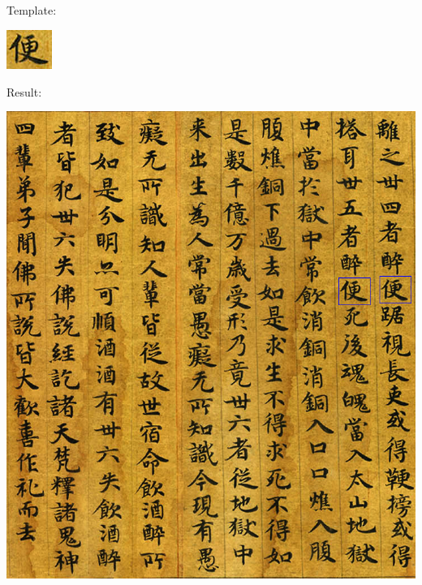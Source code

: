 \documentclass[a4paper,11pt]{article}
\begin{document}
\subsection{}
Template:
\begin{center}
\includegraphics[width=.2\textwidth]{test6}
\end{center}
Result:
\begin{center}
\includegraphics[width=.8\textwidth]{result6}
\end{center}

\clearpage
\end{document}
